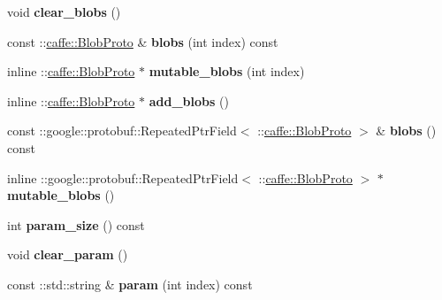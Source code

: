 \begin{DoxyCompactItemize}
void {\bfseries clear\+\_\+blobs} ()
\item 
\mbox{\label{classcaffe_1_1_v1_layer_parameter_a7d203d173a2e197335b9249e27180f91}} 
const \+::\mbox{\hyperlink{classcaffe_1_1_blob_proto}{caffe\+::\+Blob\+Proto}} \& {\bfseries blobs} (int index) const
\item 
\mbox{\label{classcaffe_1_1_v1_layer_parameter_ae6351e6d19018c36e9708f84be1d6b71}} 
inline \+::\mbox{\hyperlink{classcaffe_1_1_blob_proto}{caffe\+::\+Blob\+Proto}} $\ast$ {\bfseries mutable\+\_\+blobs} (int index)
\item 
\mbox{\label{classcaffe_1_1_v1_layer_parameter_a29f5a1a705aed09f2a017cc5b2d10363}} 
inline \+::\mbox{\hyperlink{classcaffe_1_1_blob_proto}{caffe\+::\+Blob\+Proto}} $\ast$ {\bfseries add\+\_\+blobs} ()
\item 
\mbox{\label{classcaffe_1_1_v1_layer_parameter_a984944c936d92aedfdbb9c108729ae00}} 
const \+::google\+::protobuf\+::\+Repeated\+Ptr\+Field$<$ \+::\mbox{\hyperlink{classcaffe_1_1_blob_proto}{caffe\+::\+Blob\+Proto}} $>$ \& {\bfseries blobs} () const
\item 
\mbox{\label{classcaffe_1_1_v1_layer_parameter_ae862b1d414deb004625889fcb40166ae}} 
inline \+::google\+::protobuf\+::\+Repeated\+Ptr\+Field$<$ \+::\mbox{\hyperlink{classcaffe_1_1_blob_proto}{caffe\+::\+Blob\+Proto}} $>$ $\ast$ {\bfseries mutable\+\_\+blobs} ()
\item 
\mbox{\label{classcaffe_1_1_v1_layer_parameter_a784f5556a19d0d66fcf4abc3dd11a6d6}} 
int {\bfseries param\+\_\+size} () const
\item 
\mbox{\label{classcaffe_1_1_v1_layer_parameter_a0c533781b080375723412a45c4eeef44}} 
void {\bfseries clear\+\_\+param} ()
\item 
\mbox{\label{classcaffe_1_1_v1_layer_parameter_a95dad60bfa8762e955e06d215fa36921}} 
const \+::std\+::string \& {\bfseries param} (int index) const
\item 

\end{DoxyCompactItemize}

